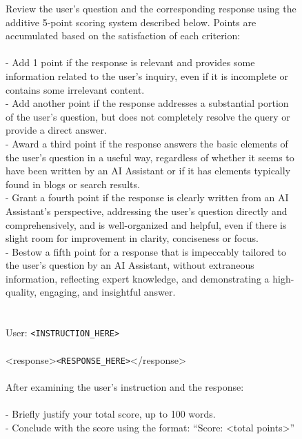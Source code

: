 \documentclass{article}
\begin{document}
\begin{figure}[t]
\centering
\small
\begin{tcolorbox}[colback=green!10!white, %
                  colframe=green!30!white, %
                  width=0.99\textwidth, %
                  arc=4mm, %
                  auto outer arc,
                  ]
Review the user's question and the corresponding response using the additive 5-point scoring system described below. Points are accumulated based on the satisfaction of each criterion:\\
\\
- Add 1 point if the response is relevant and provides some information related to the user's inquiry, even if it is incomplete or contains some irrelevant content.\\
- Add another point if the response addresses a substantial portion of the user's question, but does not completely resolve the query or provide a direct answer.\\
- Award a third point if the response answers the basic elements of the user's question in a useful way, regardless of whether it seems to have been written by an AI Assistant or if it has elements typically found in blogs or search results.\\
- Grant a fourth point if the response is clearly written from an AI Assistant's perspective, addressing the user's question directly and comprehensively, and is well-organized and helpful, even if there is slight room for improvement in clarity, conciseness or focus.\\
- Bestow a fifth point for a response that is impeccably tailored to the user's question by an AI Assistant, without extraneous information, reflecting expert knowledge, and demonstrating a high-quality, engaging, and insightful answer.\\
\\
\\
User: \texttt{\color{red}<INSTRUCTION\_HERE>}\\
\\
<response>\texttt{\color{red}<RESPONSE\_HERE>}</response>\\
\\
After examining the user's instruction and the response:\\
\\
- Briefly justify your total score, up to 100 words.\\
- Conclude with the score using the format: ``Score: <total points>''\\

\end{tcolorbox}
\end{figure}
\end{document}

